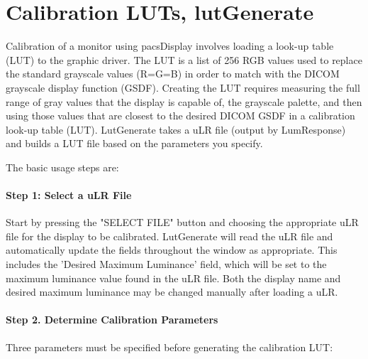 %

\section{Calibration LUTs, lutGenerate}
\label{sec:lutcal}

Calibration of a monitor using pacsDisplay involves loading a look-up table (LUT) to the graphic driver. The LUT is a list of 256 RGB values used to replace the standard grayscale values (R=G=B) in order to match with the DICOM grayscale display function (GSDF). Creating the LUT requires measuring the full range of gray values that the display is capable of, the grayscale palette, and then using those values that are closest to the desired DICOM GSDF in a calibration look-up table (LUT). LutGenerate takes a uLR file (output by LumResponse) and builds a LUT file based on the parameters you specify. 

The basic usage steps are:

\paragraph{Step 1: Select a uLR File} Start by pressing the "SELECT FILE" button and choosing the appropriate uLR file for the display to be calibrated. LutGenerate will read the uLR file and automatically update the fields throughout the window as appropriate. This includes the 'Desired Maximum Luminance' field, which will be set to the maximum luminance value found in the uLR file. Both the display name and desired maximum luminance may be changed manually after loading a uLR. 

\paragraph{Step 2. Determine Calibration Parameters} Three parameters must be specified before generating the calibration LUT:

\bigskip

